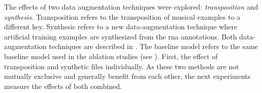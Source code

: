 
The effects of two data augmentation techniques were
explored: \emph{transposition} and \emph{synthesis}.
Transposition refers to the transposition of musical
examples to a different key. Synthesis refers to a new
data-augmentation technique where artificial training
examples are synthesized from the \gls{rna} annotations.
Both data-augmentation techniques are described in
. The baseline model refers to the
same baseline model used in the ablation studies (see
). First, the effect of
transposition and synthetic files individually. As these two
methods are not mutually exclusive and generally benefit
from each other, the next experiments measure the effects of
both combined. 
